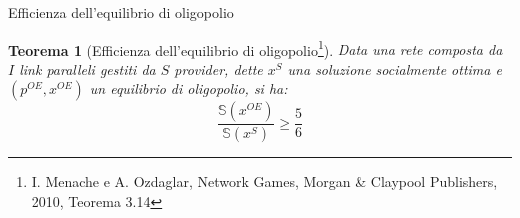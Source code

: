 \documentclass{beamer}
\newcounter{counter1}
\theoremstyle{plain}
\newtheorem{myteo}[counter1]{Teorema}
\theoremstyle{definition}
\theoremstyle{remark}
\newcommand{\pa}[1]{\left(#1\right)}
\begin{document}
\begin{frame}{Efficienza dell'equilibrio di oligopolio}
  \begin{myteo}[Efficienza dell'equilibrio di
    oligopolio\footnote{I. Menache e A. Ozdaglar, Network Games,
      Morgan \& Claypool Publishers, 2010, Teorema 3.14}]
    Data una rete composta da $I$ link paralleli gestiti da $S$
    provider, dette $x^{S}$ una soluzione socialmente ottima e
    $\pa{p^{OE},x^{OE}}$ un equilibrio di oligopolio, si ha:
    \[ \frac{\mathbb{S}\pa{x^{OE}}} {\mathbb{S}\pa{x^S}} \ge
      \frac{5}{6} \]
  \end{myteo}
\end{frame}

\begin{frame}[plain]
  \titlepage
\end{frame}
\end{document}
